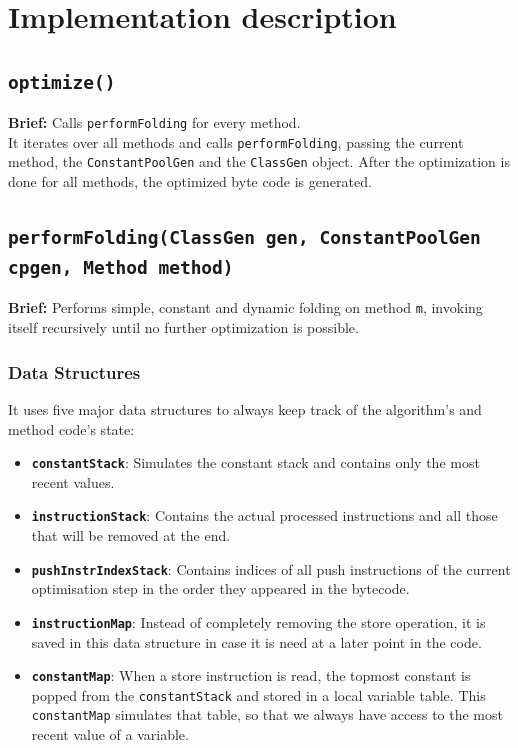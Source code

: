 \section{Implementation description}
\label{sec:description}

\subsection{\texttt{optimize()}}

\textbf{Brief: }Calls \texttt{performFolding} for every method.\\

It iterates over all methods and calls \texttt{performFolding}, passing the current method, the \texttt{ConstantPoolGen} and the \texttt{ClassGen} object. After the optimization is done for all methods, the optimized byte code is generated.

\subsection{\texttt{performFolding(ClassGen gen, ConstantPoolGen cpgen, Method method)}}
\label{subsec:performfolding}
\textbf{Brief: }Performs simple, constant and dynamic folding on method \texttt{m}, invoking itself recursively until no further optimization is possible. \\

\subsubsection{Data Structures}
It uses five major data structures to always keep track of the algorithm's and method code's state:

\begin{itemize}
\item \textbf{\texttt{constantStack}}: Simulates the constant stack and contains only the most recent values.
\item \textbf{\texttt{instructionStack}}: Contains the actual processed instructions and all those that will be removed at the end.
\item \textbf{\texttt{pushInstrIndexStack}}: Contains indices of all push instructions of the current optimisation step in the order they appeared in the bytecode.
\item \textbf{\texttt{instructionMap}}: Instead of completely removing the store operation, it is saved in this data structure in case it is need at a later point in the code.
\item \textbf{\texttt{constantMap}}: When a store instruction is read, the topmost constant is popped from the \texttt{\texttt{constantStack}} and stored in a local variable table. This \texttt{constantMap} simulates that table, so that we always have access to the most recent value of a variable.
\end{itemize}


